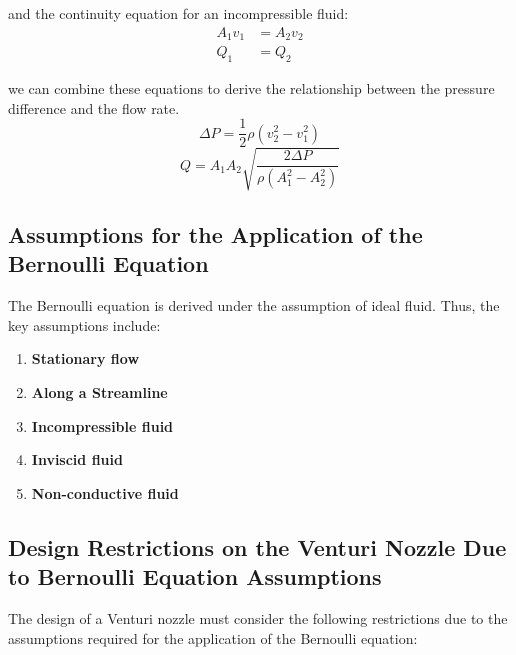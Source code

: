 \documentclass{article}
\begin{document}
and the continuity equation for an incompressible fluid:
\begin{align}
    A_1 v_1 &= A_2 v_2 \\
    Q_1 &= Q_2
\end{align}

we can combine these equations to derive the relationship between the pressure difference and the flow rate.
\begin{equation}
\Delta P = \frac{1}{2} \rho \left( v_2^2 - v_1^2 \right)
\end{equation}
\begin{equation}
Q = A_1 A_2\sqrt{\frac{2 \Delta P}{\rho \left( A_1^2 - A_2^2 \right)}}
\end{equation}

\subsection{Assumptions for the Application of the Bernoulli Equation}

The Bernoulli equation is derived under the assumption of ideal fluid. Thus, the key assumptions include:

\begin{enumerate}
    \item \textbf{Stationary flow}
    \item \textbf{Along a Streamline}
    \item \textbf{Incompressible fluid}
    \item \textbf{Inviscid fluid}
    \item \textbf{Non-conductive fluid}
    
\end{enumerate}

\subsection{Design Restrictions on the Venturi Nozzle Due to Bernoulli Equation Assumptions}

The design of a Venturi nozzle must consider the following restrictions due to the assumptions required for the application of the Bernoulli equation:
\end{document}

